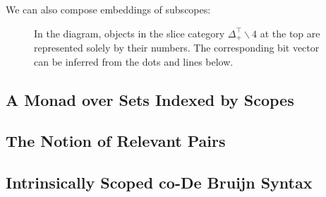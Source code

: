 \documentclass[runningheads]{llncs}
\begin{document}
\begin{example}
  We can also compose embeddings of subscopes:
  \begin{figure}[ht]
    \centering
    \caption{In the diagram, objects in the slice category $Δ_+^⊤∖4$ at the top are represented solely by their numbers. The corresponding bit vector can be inferred from the dots and lines below.}
    \label{fig:ex4}
  \end{figure}
\end{example}
\begin{definition}

\end{definition}
\subsection{A Monad over Sets Indexed by Scopes}
\subsection{The Notion of Relevant Pairs}
\subsection{Intrinsically Scoped co-De Bruijn Syntax}

% 

\printbibliography{}
\end{document}
